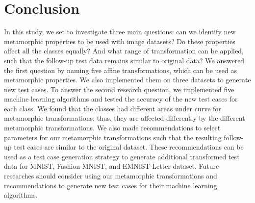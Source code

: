 \section{Conclusion}
In this study, we set to investigate three main questions: can we identify new metamorphic properties to be used with image datasets? Do these properties affect all the classes equally? And what range of transformation can be applied, such that the follow-up test data remains similar to original data? We answered the first question by naming five affine transformations, which can be used as metamorphic properties. We also implemented them on three datasets to generate new test cases. To answer the second research question, we implemented five machine learning algorithms and tested the accuracy of the new test cases for each class. We found that the classes had different areas under curve for metamorphic transformations; thus, they are affected differently by the different metamorphic transformations. 
We also made recommendations to select parameters for our metamorphic transformations such that the resulting follow-up test cases are similar to the original dataset. These recommendations can be used as a test case generation strategy to generate additional transformed test data for MNIST, Fashion-MNIST, and EMNIST-Letter dataset. Future researches should consider using our metamorphic transformations and recommendations to generate new test cases for their machine learning algorithms.